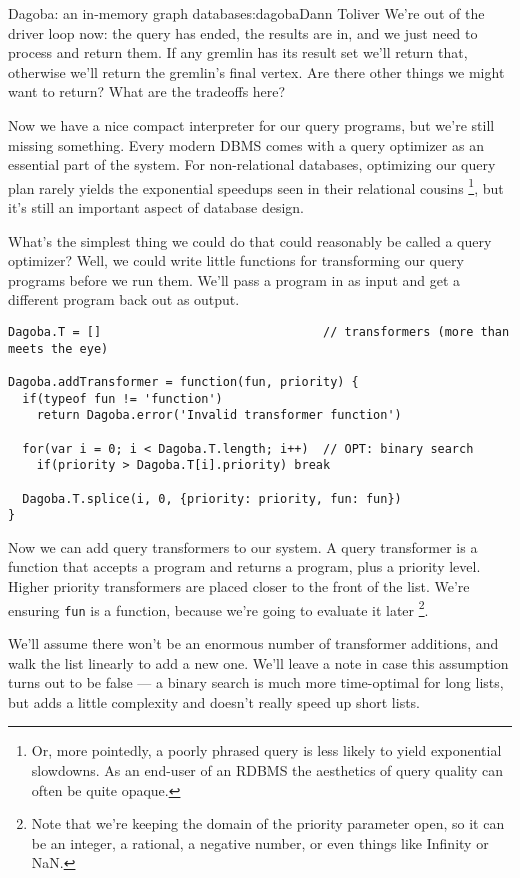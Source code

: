 \begin{aosachapter}{Dagoba: an in-memory graph database}{s:dagoba}{Dann Toliver}
We're out of the driver loop now: the query has ended, the results are
in, and we just need to process and return them. If any gremlin has its
result set we'll return that, otherwise we'll return the gremlin's final
vertex. Are there other things we might want to return? What are the
tradeoffs here?

\label{query-transformers}

Now we have a nice compact interpreter for our query programs, but we're
still missing something. Every modern DBMS comes with a query optimizer
as an essential part of the system. For non-relational databases,
optimizing our query plan rarely yields the exponential speedups seen in
their relational cousins \footnote{Or, more pointedly, a poorly phrased
  query is less likely to yield exponential slowdowns. As an end-user of
  an RDBMS the aesthetics of query quality can often be quite opaque.},
but it's still an important aspect of database design.

What's the simplest thing we could do that could reasonably be called a
query optimizer? Well, we could write little functions for transforming
our query programs before we run them. We'll pass a program in as input
and get a different program back out as output.

\begin{verbatim}
Dagoba.T = []                               // transformers (more than meets the eye)

Dagoba.addTransformer = function(fun, priority) {
  if(typeof fun != 'function')
    return Dagoba.error('Invalid transformer function')

  for(var i = 0; i < Dagoba.T.length; i++)  // OPT: binary search
    if(priority > Dagoba.T[i].priority) break

  Dagoba.T.splice(i, 0, {priority: priority, fun: fun})
}
\end{verbatim}

Now we can add query transformers to our system. A query transformer is
a function that accepts a program and returns a program, plus a priority
level. Higher priority transformers are placed closer to the front of
the list. We're ensuring \texttt{fun} is a function, because we're going
to evaluate it later \footnote{Note that we're keeping the domain of the
  priority parameter open, so it can be an integer, a rational, a
  negative number, or even things like Infinity or NaN.}.

We'll assume there won't be an enormous number of transformer additions,
and walk the list linearly to add a new one. We'll leave a note in case
this assumption turns out to be false --- a binary search is much more
time-optimal for long lists, but adds a little complexity and doesn't
really speed up short lists.


\end{aosachapter}

